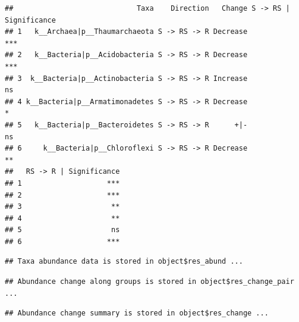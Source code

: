 \documentclass[
]{book}
\newenvironment{Shaded}{\begin{snugshade}}{\end{snugshade}}
\newcommand{\AttributeTok}[1]{\textcolor[rgb]{0.13,0.29,0.53}{#1}}
\newcommand{\CommentTok}[1]{\textcolor[rgb]{0.56,0.35,0.01}{\textit{#1}}}
\newcommand{\ConstantTok}[1]{\textcolor[rgb]{0.56,0.35,0.01}{#1}}
\newcommand{\FloatTok}[1]{\textcolor[rgb]{0.00,0.00,0.81}{#1}}
\newcommand{\FunctionTok}[1]{\textcolor[rgb]{0.13,0.29,0.53}{\textbf{#1}}}
\newcommand{\NormalTok}[1]{#1}
\newcommand{\OtherTok}[1]{\textcolor[rgb]{0.56,0.35,0.01}{#1}}
\newcommand{\SpecialCharTok}[1]{\textcolor[rgb]{0.81,0.36,0.00}{\textbf{#1}}}
\newcommand{\StringTok}[1]{\textcolor[rgb]{0.31,0.60,0.02}{#1}}
\begin{document}
\begin{verbatim}
##                             Taxa    Direction   Change S -> RS | Significance
## 1   k__Archaea|p__Thaumarchaeota S -> RS -> R Decrease                    ***
## 2   k__Bacteria|p__Acidobacteria S -> RS -> R Decrease                    ***
## 3  k__Bacteria|p__Actinobacteria S -> RS -> R Increase                     ns
## 4 k__Bacteria|p__Armatimonadetes S -> RS -> R Decrease                      *
## 5   k__Bacteria|p__Bacteroidetes S -> RS -> R      +|-                     ns
## 6     k__Bacteria|p__Chloroflexi S -> RS -> R Decrease                     **
##   RS -> R | Significance
## 1                    ***
## 2                    ***
## 3                     **
## 4                     **
## 5                     ns
## 6                    ***
\end{verbatim}

\begin{Shaded}
\end{Shaded}

\begin{verbatim}
## Taxa abundance data is stored in object$res_abund ...
\end{verbatim}

\begin{verbatim}
## Abundance change along groups is stored in object$res_change_pair ...
\end{verbatim}

\begin{verbatim}
## Abundance change summary is stored in object$res_change ...
\end{verbatim}

\begin{Shaded}
\end{Shaded}
\end{document}

